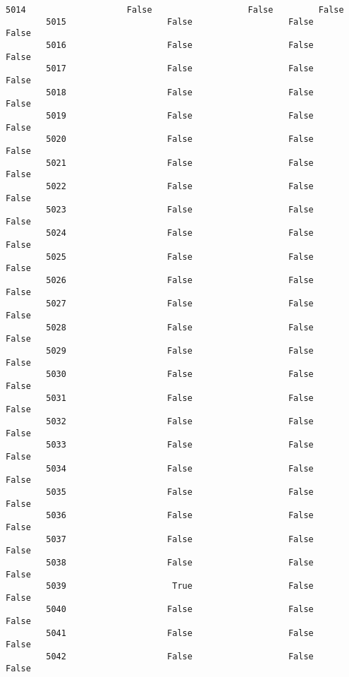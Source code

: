 \documentclass[11pt]{article}
\begin{document}
\begin{Verbatim}[commandchars=\\\{\}]
        5014                    False                   False         False   
        5015                    False                   False         False   
        5016                    False                   False         False   
        5017                    False                   False         False   
        5018                    False                   False         False   
        5019                    False                   False         False   
        5020                    False                   False         False   
        5021                    False                   False         False   
        5022                    False                   False         False   
        5023                    False                   False         False   
        5024                    False                   False         False   
        5025                    False                   False         False   
        5026                    False                   False         False   
        5027                    False                   False         False   
        5028                    False                   False         False   
        5029                    False                   False         False   
        5030                    False                   False         False   
        5031                    False                   False         False   
        5032                    False                   False         False   
        5033                    False                   False         False   
        5034                    False                   False         False   
        5035                    False                   False         False   
        5036                    False                   False         False   
        5037                    False                   False         False   
        5038                    False                   False         False   
        5039                     True                   False         False   
        5040                    False                   False         False   
        5041                    False                   False         False   
        5042                    False                   False         False   
        

\end{Verbatim}
\end{document}
